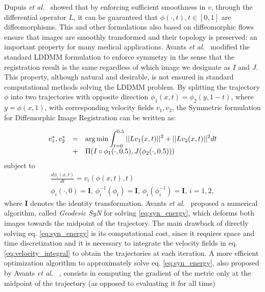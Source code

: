 Dupuis {\it et al.}~\cite{Dupuis1998} showed that by enforcing sufficient smoothness
in $v$, through the differential operator $L$, it can be guaranteed that $\phi(\cdot, t), t \in [0, 1]$ are diffeomorphisms. This and other formulations also based on
diffeomorphic flows ensure that images are smoothly transformed and their topology is preserved: an important property for many medical applications. Avants {\it et al.}~\cite{Avants2008} \cite{Avants2011} modified the standard LDDMM formulation to enforce symmetry in the sense that the registration result is the same regardless of which image we designate as $I$ and $J$. This property, although natural and desirable, is not ensured in standard computational methods solving the LDDMM problem. By splitting the trajectory $\phi$ into two trajectories with opposite direction $\phi_{1}(x, t) = \phi_{2}(y, 1-t)$, where $y = \phi(x, 1)$, with corresponding velocity fields $v_{1}, v_{2}$, the Symmetric formulation
for Diffemorphic Image Registration \cite{Avants2008}\cite{Avants2011} can be written as:

\begin{equation}\label{eq:syn_energy}
    \begin{array}{lll}
        v_{1}^{*}, v_{2}^{*} &=& \mathlarger{\arg \min \int_{t=0}^{0.5} ||L v_{1}(x, t)||^{2} + ||L v_{2}(x, t)||^{2} dt}\\
        &+& \mathlarger{ \Pi(I \circ \phi_{1}(\cdot, 0.5), J(\phi_{2}(\cdot, 0.5)))}
    \end{array}
\end{equation}
subject to
\begin{equation}\label{eq:syn_energy_constraints}
    \begin{array}{l}
        \frac{d\phi_{i}(x, t)}{dt} = v_{i}(\phi(x,t),t)\\
        \phi_{i}(\cdot, 0) = \mathbf{I},\, \phi_{i}^{-1}(\phi_{i}) = \mathbf{I},\, \phi_{i}(\phi_{i}^{-1}) = \mathbf{I},\, i=1,2,
    \end{array}
\end{equation}
where $\mathbf{I}$ denotes the identity transformation. Avants {\it et al.}~\cite{Avants2006} proposed a numerical algorithm, called \textit{Geodesic SyN} for solving \eqref{eq:syn_energy}, which deforms both images towards the midpoint of the trajectory. The main drawback of directly solving eq. \eqref{eq:syn_energy} is its computational cost, since it requires space and time discretization and
it is necessary to integrate the velocity fields in eq. \eqref{eq:velocity_integral} to obtain the trajectories at each iteration. A more efficient optimization algorithm
to approximately solve eq. \eqref{eq:syn_energy}, also proposed by Avants {\it et al.}~\cite{Avants2008} \cite{Avants2011}, consists in computing the gradient of the metric only at the
midpoint of the trajectory (as opposed to evaluating it for all time)

